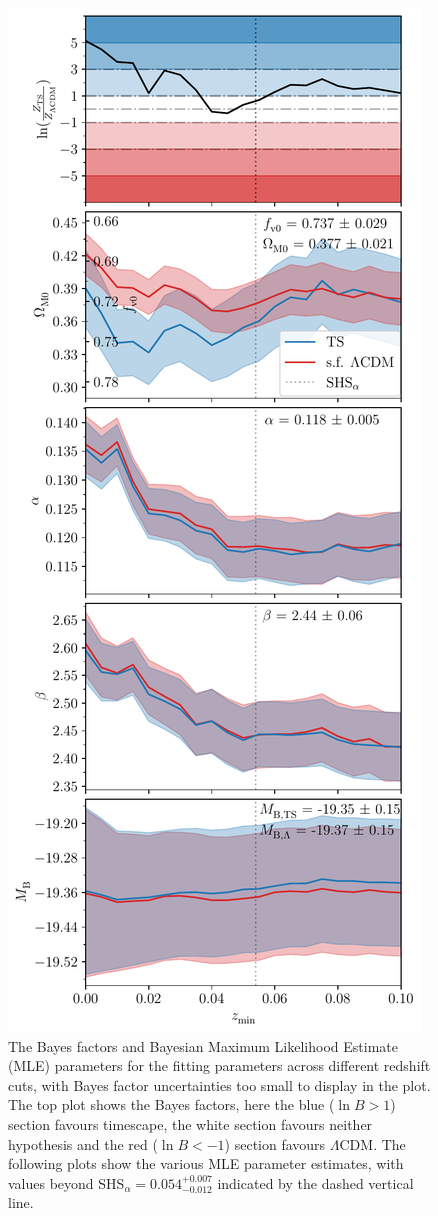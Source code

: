 \documentclass[fleqn,usenatbib,onecolumn,referee]{mnras}
\newcommand{\LA}{\Lambda}
\newcommand{\LCDM}{$\LA$CDM}
\begin{document}
\begin{figure}
    \includegraphics[width=\columnwidth]{images/multiple_plot_tripp.pdf}
    \caption{The Bayes factors and Bayesian Maximum Likelihood Estimate (MLE) parameters for the fitting parameters across different redshift cuts, with Bayes factor uncertainties too small to display in the plot. The top plot shows the Bayes factors, here the blue ($\ln B > 1$) section favours timescape, the white section favours neither hypothesis and the red ($\ln B < -1$) section favours \LCDM. The following plots show the various MLE parameter estimates, with values beyond SHS$_\alpha = 0.054^{+0.007}_{-0.012}$ indicated by the dashed vertical line.}
    \label{fig:results}
\end{figure}
\end{document}
